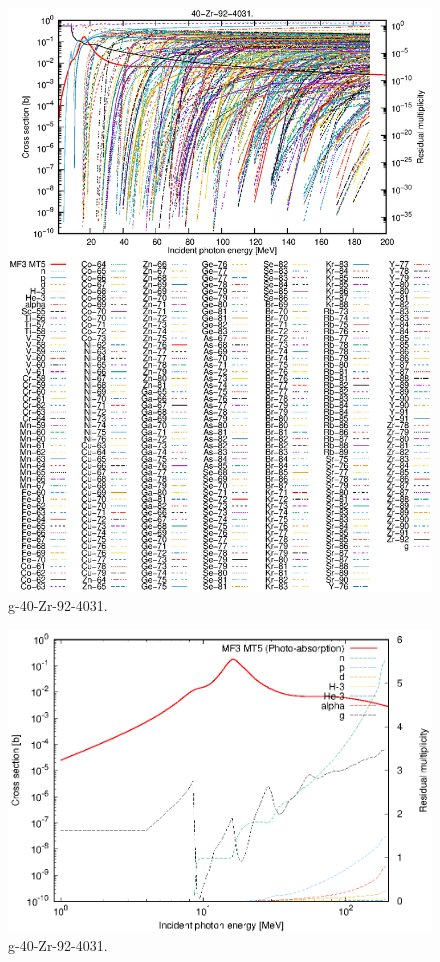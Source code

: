 \begin{figure}
 \includegraphics[width=\linewidth]{eps/g_40-Zr-92_4031.eps}
  \caption{g-40-Zr-92-4031.}
\end{figure}
\newpage \clearpage

\begin{figure}
 \includegraphics[width=\linewidth]{eps-log/g_40-Zr-92_4031.eps}
 \caption{g-40-Zr-92-4031.}
\end{figure}
\newpage \clearpage

